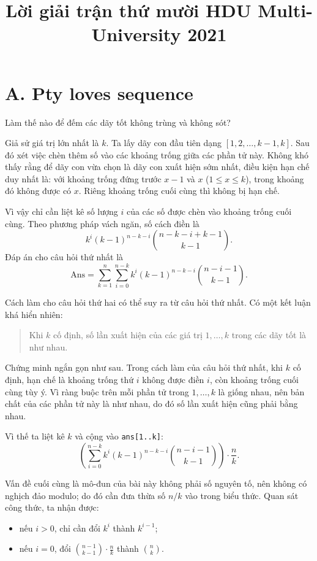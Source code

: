 \documentclass[11pt]{article}
\title{Lời giải trận thứ mười HDU Multi-University 2021}
\author{}
\date{}
\begin{document}
\maketitle


\section{A. Pty loves sequence}

Làm thế nào để đếm các dãy tốt không trùng và không sót?

Giả sử giá trị lớn nhất là $k$. Ta lấy dãy con đầu tiên dạng
$[1,2,\ldots,k-1,k]$. Sau đó xét việc chèn thêm số vào các khoảng trống giữa
các phần tử này. Không khó thấy rằng để dãy con vừa chọn là dãy con xuất
hiện sớm nhất, điều kiện hạn chế duy nhất là: với khoảng trống đứng trước
$x-1$ và $x$ ($1\le x\le k$), trong khoảng đó không được có $x$. Riêng khoảng
trống cuối cùng thì không bị hạn chế.

Vì vậy chỉ cần liệt kê số lượng $i$ của các số được chèn vào khoảng trống
cuối cùng. Theo phương pháp vách ngăn, số cách điền là
\[
  k^i (k-1)^{n-k-i}\binom{n-k-i+k-1}{k-1}.
\]
Đáp án cho câu hỏi thứ nhất là
\[
  \mathrm{Ans}
  =
  \sum_{k=1}^{n}\sum_{i=0}^{n-k}
  k^i (k-1)^{n-k-i}\binom{n-i-1}{k-1}.
\]

Cách làm cho câu hỏi thứ hai có thể suy ra từ câu hỏi thứ nhất. Có một kết
luận khá hiển nhiên:
\begin{quote}
Khi $k$ cố định, số lần xuất hiện của các giá trị $1,\ldots,k$ trong các dãy
tốt là như nhau.
\end{quote}

Chứng minh ngắn gọn như sau. Trong cách làm của câu hỏi thứ nhất, khi $k$ cố
định, hạn chế là khoảng trống thứ $i$ không được điền $i$, còn khoảng trống
cuối cùng tùy ý. Vì ràng buộc trên mỗi phần tử trong $1,\ldots,k$ là giống
nhau, nên bản chất của các phần tử này là như nhau, do đó số lần xuất hiện
cũng phải bằng nhau.

Vì thế ta liệt kê $k$ và cộng vào \texttt{ans[1..k]}:
\[
  \left(
  \sum_{i=0}^{n-k}
  k^i (k-1)^{n-k-i}\binom{n-i-1}{k-1}
  \right)\cdot \frac{n}{k}.
\]

Vấn đề cuối cùng là mô-đun của bài này không phải số nguyên tố, nên không có
nghịch đảo modulo; do đó cần đưa thừa số $n/k$ vào trong biểu thức. Quan sát
công thức, ta nhận được:
\begin{itemize}
  \item nếu $i>0$, chỉ cần đổi $k^i$ thành $k^{i-1}$;
  \item nếu $i=0$, đổi
  $\binom{n-1}{k-1}\cdot \frac{n}{k}$ thành $\binom{n}{k}$.
\end{itemize}
\end{document}
